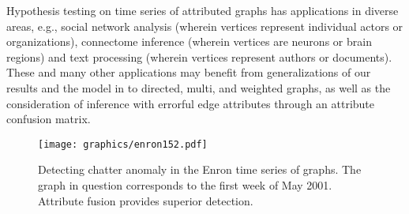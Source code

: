\documentclass[10pt,journal,compsoc]{IEEEtran}
\theoremstyle{definition}
\begin{document}
Hypothesis testing on time series of attributed graphs has
applications in diverse areas, e.g., social network analysis (wherein
vertices represent individual actors or organizations), connectome
inference (wherein vertices are neurons or brain regions) and text
processing (wherein vertices represent authors or documents). These
and many other applications may benefit from generalizations of our
results and the model in \cite{lee11} to directed, multi, and weighted
graphs, as well as the consideration of inference with errorful edge
attributes through an attribute confusion matrix.
\begin{figure}[tbp]
  \centering
 \texttt{[image: graphics/enron152.pdf]} 
  \caption{Detecting chatter anomaly in the Enron time series of
    graphs. The graph in question corresponds to the first week of May
    2001. Attribute fusion provides superior detection.}
  \label{fig:enron}
\end{figure}
  
\end{document}

